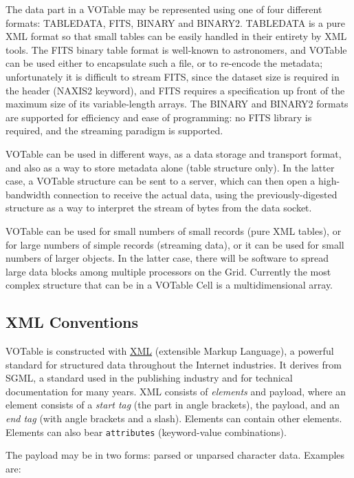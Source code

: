\documentclass[11pt,a4paper]{ivoa}
\let\A=\href
\let\fg=\color
\def\attr#1{{\tt{\fg{DarkRed}#1}}}
\begin{document}
The data part in a  VOTable may be represented using one of four
different formats: TABLEDATA, FITS, BINARY and BINARY2. TABLEDATA is a
pure XML format so that small tables can be easily handled in their
entirety by XML tools. The FITS binary table format is well-known to
astronomers, and VOTable can be used either to encapsulate such a
file, or to re-encode the metadata; unfortunately it is difficult to
stream FITS, since the dataset size is required in the header
(NAXIS2 keyword), and FITS requires a specification up front of the maximum
size of its variable-length arrays. The BINARY and BINARY2 formats
are supported for efficiency and ease of programming: no FITS
library is required, and the streaming paradigm is supported.

VOTable can be used in different ways, as a data
storage and transport format, and also as a way to store metadata
alone (table structure only).  In the latter case, a
VOTable structure can be sent to a server, which can then open a
high-bandwidth connection to receive the actual data, using the
previously-digested structure as a way to interpret the stream of
bytes from the data socket.

VOTable can be used for small numbers of small records (pure XML
tables), or for large numbers of simple records (streaming data), or
it can be used for small numbers of larger objects. In the latter
case, there will be software to spread large data blocks among
multiple processors on the Grid. Currently the most complex structure
that can be in a VOTable Cell is a multidimensional array.


\subsection{XML Conventions}

VOTable is constructed with \A{http://www.w3.org/XML/}{XML} (extensible Markup Language), a
powerful standard for structured data throughout the Internet
industries. It derives %
from SGML, %
a standard used in the publishing industry and for
technical documentation for many years. XML
consists of {\it elements} and payload, where an element consists of
a {\it start tag} (the part in angle brackets), the payload, and an
{\it end tag} (with angle brackets and a slash). Elements can
contain other elements. Elements can also bear
{\attr{attributes}}
(keyword-value combinations).


The payload may be in two forms: parsed or unparsed character
data. Examples are:
\end{document}
